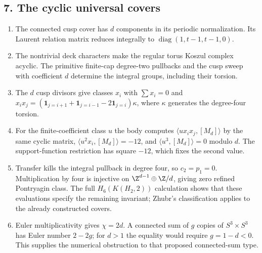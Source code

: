 \subsection*{7. The cyclic universal covers}
\RungOne
\begin{enumerate}[label=\arabic*.,leftmargin=*]
\item The connected cusp cover has $d$ components in its periodic
normalization.  Its Laurent relation matrix reduces integrally
to $\operatorname{diag}(1,t-1,t-1,0)$.
\item The nontrivial deck characters make the regular torus Koszul
complex acyclic.  The primitive finite-cap degree-two pullbacks
and the cusp sweep with coefficient $d$ determine the integral
groups, including their torsion.
\item The $d$ cusp divisors give classes $x_i$ with
$\sum x_i=0$ and
$x_ix_j=(\mathbf1_{j=i+1}+\mathbf1_{j=i-1}-2\mathbf1_{j=i})\kappa$,
where $\kappa$ generates the degree-four torsion.
\item For the finite-coefficient class $u$ the body computes
$\langle ux_ix_j,[M_d]\rangle$ by the same cyclic matrix,
$\langle u^2x_i,[M_d]\rangle=-12$, and
$\langle u^3,[M_d]\rangle=0$ modulo $d$.  The support-function
restriction has square $-12$, which fixes the second value.
\item Transfer kills the integral pullback in degree four, so
$c_2=p_1=0$.  Multiplication by four is injective on
$\Z^{d-1}\oplus\Z/d$, giving zero refined Pontryagin class.
The full $H_6(K(H_2,2))$ calculation shows that these evaluations
specify the remaining invariant; Zhubr's classification applies
to the already constructed covers.
\item Euler multiplicativity gives $\chi=2d$.  A connected sum of
$g$ copies of $S^3\times S^3$ has Euler number $2-2g$; for
$d>1$ the equality would require $g=1-d<0$.  This supplies the
numerical obstruction to that proposed connected-sum type.
\end{enumerate}

